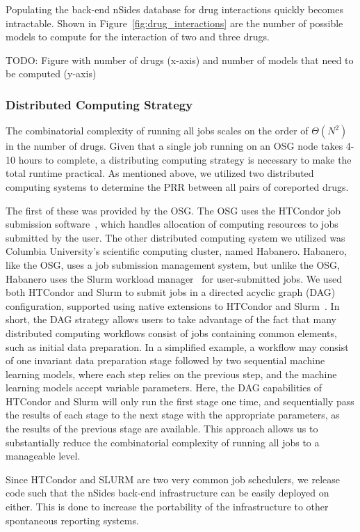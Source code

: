 \documentclass{ws-procs11x85}
\begin{document}
Populating the back-end nSides database for drug interactions quickly
becomes intractable.  Shown in Figure~\ref{fig:drug_interactions} are
the number of possible models to compute for the interaction of two
and three drugs.

TODO: Figure with number of drugs (x-axis) and number of models that need to be computed (y-axis)

\subsubsection{Distributed Computing Strategy}
The combinatorial complexity of running all jobs scales on the order
of $\Theta(N^2)$ in the number of drugs. Given that a single job
running on an OSG node takes 4-10 hours to complete, a distributing
computing strategy is necessary to make the total runtime
practical. As mentioned above, we utilized two distributed computing systems to determine
the PRR between all pairs of coreported drugs.

The first of these was provided by the OSG. The OSG uses the HTCondor job submission
software~\cite{beowulfbook-condor}, which handles allocation of
computing resources to jobs submitted by the user. The other
distributed computing system we utilized was Columbia University's
scientific computing cluster, named Habanero. Habanero, like the OSG,
uses a job submission management system, but unlike the OSG, Habanero
uses the Slurm workload manager~\cite{slurm} for user-submitted
jobs. We used both HTCondor and Slurm to submit jobs in a directed
acyclic graph (DAG) configuration, supported using native extensions
to HTCondor and Slurm~\cite{dagman}. In short, the DAG strategy allows
users to take advantage of the fact that many distributed computing
workflows consist of jobs containing common elements, such as initial
data preparation. In a simplified example, a workflow may consist of
one invariant data preparation stage followed by two sequential
machine learning models, where each step relies on the previous step,
and the machine learning models accept variable parameters. Here, the
DAG capabilities of HTCondor and Slurm will only run the first stage
one time, and sequentially pass the results of each stage to the next
stage with the appropriate parameters, as the results of the previous
stage are available. This approach allows us to substantially reduce
the combinatorial complexity of running all jobs to a manageable
level.

Since HTCondor and SLURM are two very common job schedulers, we
release code such that the nSides back-end infrastructure can be
easily deployed on either. This is done to increase the portability of
the infrastructure to other spontaneous reporting systems.
\end{document}
